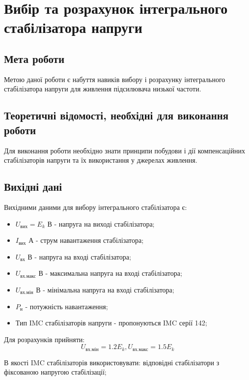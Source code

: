 \documentclass[main.tex]{subfiles}
\begin{document}
\section{Вибір та розрахунок інтегрального стабілізатора напруги}

\subsection{Мета роботи}

Метою даної роботи є набуття навиків вибору і розрахунку інтегрального стабілізатора напруги для живлення підсилювача низької частоти.

\subsection{Теоретичні відомості, необхідні для виконання роботи}

Для виконання роботи необхідно знати принципи побудови і дії
компенсаційних стабілізаторів напруги та їх використання у джерелах живлення.

\subsection{Вихідні дані}

Вихідними даними для вибору інтегрального стабілізатора є:
\begin{itemize}
    \item $U_{\text{вих}} = E_k$ В - напруга на виході стабілізатора;
    \item $I_{\text{вих}} $ А - струм навантаження стабілізатора;
    \item $U_{\text{вх}} $ В - напруга на вході стабілізатора;
    \item $U_{\text{вх.макс}} $ В - максимальна напруга на вході стабілізатора;
    \item $U_{\text{вх.мін}} $ В - мінімальна напруга на вході стабілізатора;
    \item $P_{\text{н}}$ - потужність навантаження;
    \item Тип IMC стабілізаторів напруги - пропонуються IMC серії 142;
\end{itemize}

Для розрахунків прийняти:
\[
U_{\text{вх.мін}} = 1.2 E_k, U_{\text{вх.макс}} = 1.5 E_k
\]

В якості IMC стабілізаторів використовувати: відповідні стабілізатори з фіксованою напругою стабілізації;
\end{document}
